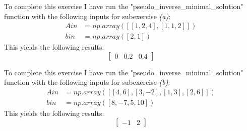 To complete this exercise I have run the "pseudo\_inverse\_minimal\_solution" function with the following inputs for subexercise \textit{(a)}:
\begin{align*}
  Ain &= np.array([[1,2,4],[1,1,2]]) \\
  bin &= np.array([2,1])
\end{align*}
This yields the following results:
$$
\begin{bmatrix}
  0 & 0.2 & 0.4
\end{bmatrix}
$$

To complete this exercise I have run the "pseudo\_inverse\_minimal\_solution" function with the following inputs for subexercise \textit{(b)}:
\begin{align*}
  Ain &= np.array([[4,6],[3,-2],[1,3],[2,6]]) \\
  bin &= np.array([8,-7,5,10])
\end{align*}
This yields the following results:
$$
\begin{bmatrix}
  -1 & 2
\end{bmatrix}
$$
